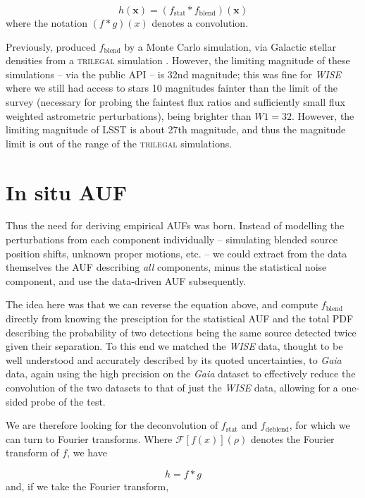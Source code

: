 \documentclass[fleqn,usenatbib]{mnras}
\begin{document}
\begin{equation}
h(\textbf{x}) = (f_\mathrm{stat} * f_\mathrm{blend})(\textbf{x})
\end{equation}
where the notation $(f * g)(x)$ denotes a convolution.

Previously, \citet{2018MNRAS.481.2148W} produced $f_\mathrm{blend}$ by a Monte Carlo simulation, via Galactic stellar densities from a \textsc{trilegal} simulation \citep{Girardi2005}. However, the limiting magnitude of these simulations -- via the public API -- is 32nd magnitude; this was fine for \textit{WISE} where we still had access to stars 10 magnitudes fainter than the limit of the survey (necessary for probing the faintest flux ratios and sufficiently small flux weighted astrometric perturbations), being brighter than $W1=32$. However, the limiting magnitude of LSST is about 27th magnitude, and thus the magnitude limit is out of the range of the \textsc{trilegal} simulations.

\section{In situ AUF}
Thus the need for deriving empirical AUFs was born. Instead of modelling the perturbations from each component individually -- simulating blended source position shifts, unknown proper motions, etc. -- we could extract from the data themselves the AUF describing \textit{all} components, minus the statistical noise component, and use the data-driven AUF subsequently.

The idea here was that we can reverse the equation above, and compute $f_\mathrm{blend}$ directly from knowing the presciption for the statistical AUF and the total PDF describing the probability of two detections being the same source detected twice given their separation. To this end we matched the \textit{WISE} data, thought to be well understood and accurately described by its quoted uncertainties, to \textit{Gaia} data, again using the high precision on the \textit{Gaia} dataset to effectively reduce the convolution of the two datasets to that of just the \textit{WISE} data, allowing for a one-sided probe of the test.

We are therefore looking for the deconvolution of $f_\mathrm{stat}$ and $f_\mathrm{deblend}$, for which we can turn to Fourier transforms. Where $\mathcal{F}[f(x)](\rho)$ denotes the Fourier transform of $f$, we have

\begin{equation}
	h = f * g
\end{equation}
and, if we take the Fourier transform,
\end{document}
